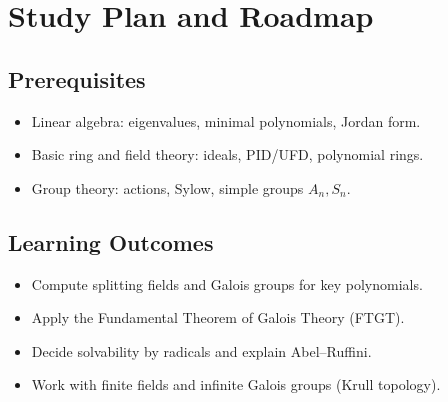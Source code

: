 \section{Study Plan and Roadmap}

\subsection*{Prerequisites}
\begin{itemize}
  \item Linear algebra: eigenvalues, minimal polynomials, Jordan form.
  \item Basic ring and field theory: ideals, PID/UFD, polynomial rings.
  \item Group theory: actions, Sylow, simple groups $A_n,S_n$.
\end{itemize}

\subsection*{Learning Outcomes}
\begin{itemize}
  \item Compute splitting fields and Galois groups for key polynomials.
  \item Apply the Fundamental Theorem of Galois Theory (FTGT).
  \item Decide solvability by radicals and explain Abel--Ruffini.
  \item Work with finite fields and infinite Galois groups (Krull topology).
\end{itemize}

